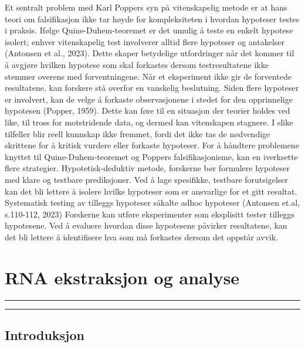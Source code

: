 \documentclass[
  letterpaper,
  DIV=11,
  numbers=noendperiod]{scrreprt}
\begin{document}
Et sentralt problem med Karl Poppers syn på vitenskapelig metode er at
hans teori om falsifikasjon ikke tar høyde for kompleksiteten i hvordan
hypoteser testes i praksis. Ifølge Quine-Duhem-teoremet er det umulig å
teste en enkelt hypotese isolert; enhver vitenskapelig test involverer
alltid flere hypoteser og antakelser (Antonsen et al., 2023). Dette
skaper betydelige utfordringer når det kommer til å avgjøre hvilken
hypotese som skal forkastes dersom testresultatene ikke stemmer overens
med forventningene. Når et eksperiment ikke gir de forventede
resultatene, kan forskere stå overfor en vanskelig beslutning. Siden
flere hypoteser er involvert, kan de velge å forkaste observasjonene i
stedet for den opprinnelige hypotesen (Popper, 1959). Dette kan føre til
en situasjon der teorier holdes ved like, til tross for motstridende
data, og dermed kan vitenskapen stagnere. I slike tilfeller blir reell
kunnskap ikke fremmet, fordi det ikke tas de nødvendige skrittene for å
kritisk vurdere eller forkaste hypoteser. For å håndtere problemene
knyttet til Quine-Duhem-teoremet og Poppers falsifikasjonisme, kan en
iverksette flere strategier. Hypotetisk-deduktiv metode, forskerne bør
formulere hypoteser med klare og testbare prediksjoner. Ved å lage
spesifikke, testbare forutsigelser kan det bli lettere å isolere hvilke
hypoteser som er ansvarlige for et gitt resultat. Systematisk testing av
tilleggs hypoteser såkalte adhoc hypoteser (Antonsen et.al, s.110-112,
2023) Forskerne kan utføre eksperimenter som eksplisitt tester tilleggs
hypotesene. Ved å evaluere hvordan disse hypotesene påvirker
resultatene, kan det bli lettere å identifisere hva som må forkastes
dersom det oppstår avvik.


\chapter{RNA ekstraksjon og analyse}\label{rna-ekstraksjon-og-analyse}

\begin{center}\rule{0.5\linewidth}{0.5pt}\end{center}

\begin{center}\rule{0.5\linewidth}{0.5pt}\end{center}

\section{Introduksjon}\label{introduksjon-5}
\end{document}

